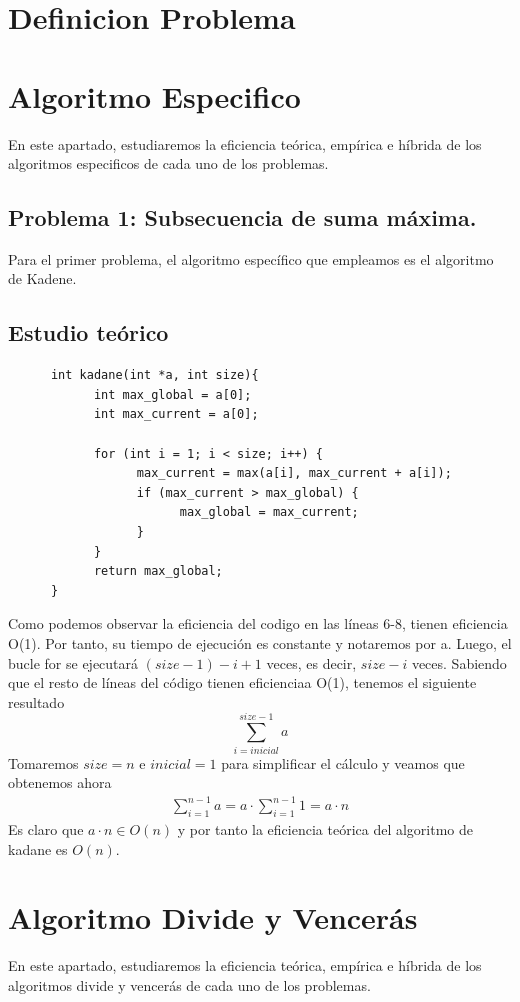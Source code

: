 \documentclass[11pt,openany]{book}
\begin{document}
\chapter{Definicion Problema}
\chapter{Algoritmo Especifico}
En este apartado, estudiaremos la eficiencia teórica, empírica e híbrida de los algoritmos especificos
de cada uno de los problemas.
\section{Problema 1: Subsecuencia de suma máxima.}
Para el primer problema, el algoritmo específico que empleamos es el algoritmo de Kadene.
\section*{Estudio teórico}
\begin{lstlisting}
      int kadane(int *a, int size){
            int max_global = a[0];
            int max_current = a[0];

            for (int i = 1; i < size; i++) {
                  max_current = max(a[i], max_current + a[i]);
                  if (max_current > max_global) {
                        max_global = max_current;
                  }
            }
            return max_global;
      }
\end{lstlisting}
Como podemos observar la eficiencia del codigo en las líneas 6-8, tienen eficiencia O(1). Por tanto,
su tiempo de ejecución es constante y notaremos por a. Luego, el bucle for se ejecutará  $(size-1)-i+1 $ 
veces, es decir, $size-i$ veces. Sabiendo que el resto de líneas del código tienen eficienciaa O(1), tenemos
el siguiente resultado
\begin{equation*}
      \sum_{i=inicial}^{size-1} a
  \end{equation*}
  Tomaremos $size =  n$ e $inicial = 1$ para simplificar el cálculo y veamos que obtenemos ahora
  \begin{equation*}\begin{split}
          \sum_{i=1}^{n-1} a = a \cdot \sum_{i=1}^{n-1} 1= a \cdot n
      \end{split}\end{equation*}
  Es claro que $a \cdot  n \in O(n)$ y por tanto la eficiencia teórica del algoritmo de kadane es $O(n)$.
  
\chapter{Algoritmo Divide y Vencerás}
En este apartado, estudiaremos la eficiencia teórica, empírica e híbrida de los algoritmos divide y vencerás
de cada uno de los problemas.
\end{document}
